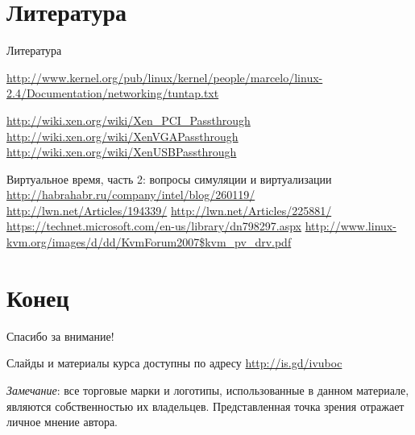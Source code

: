 \section{Литература}

\begin{frame}[allowframebreaks]{Литература}
\begin{thebibliography}{99}
      \url{http://www.kernel.org/pub/linux/kernel/people/marcelo/linux-2.4/Documentation/networking/tuntap.txt}

     \url{http://wiki.xen.org/wiki/Xen_PCI_Passthrough}
        \url{http://wiki.xen.org/wiki/XenVGAPassthrough}
        \url{http://wiki.xen.org/wiki/XenUSBPassthrough}

     Виртуальное время, часть 2: вопросы симуляции и виртуализации \url{http://habrahabr.ru/company/intel/blog/260119/}
     \url{http://lwn.net/Articles/194339/}
     \url{http://lwn.net/Articles/225881/}
     \url{https://technet.microsoft.com/en-us/library/dn798297.aspx}
     \url{http://www.linux-kvm.org/images/d/dd/KvmForum2007$kvm_pv_drv.pdf}
\end{thebibliography}
\end{frame}


\section{Конец}
\begin{frame}

{\huge{Спасибо за внимание!}\par}

\vfill

Слайды и материалы курса доступны по адресу \url{http://is.gd/ivuboc} %

\vfill

\tiny{\textit{Замечание}: все торговые марки и логотипы, использованные в данном материале, являются собственностью их владельцев. Представленная точка зрения отражает личное мнение автора.
}

\end{frame}



